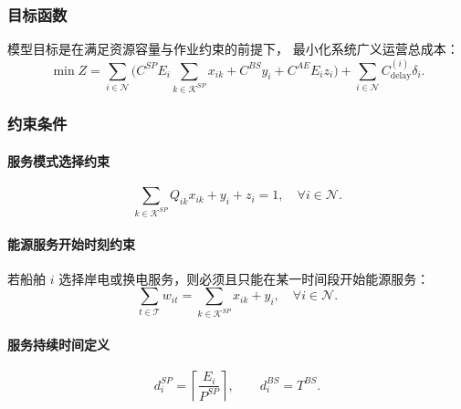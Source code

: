 \documentclass[UTF8, a4paper, 12pt]{ctexart}
\theoremstyle{plain}
\theoremstyle{definition}
\theoremstyle{remark}
\begin{document}
\subsubsection{目标函数}

模型目标是在满足资源容量与作业约束的前提下，
最小化系统广义运营总成本：
\begin{equation}
\min Z =
\sum_{i \in \mathcal{N}}
\Big(
C^{SP} E_i \sum_{k \in \mathcal{K}^{SP}} x_{ik}
+ C^{BS} y_i
+ C^{AE} E_i z_i
\Big)
+ \sum_{i \in \mathcal{N}} C^{(i)}_{\text{delay}} \delta_i .
\label{eq:obj_24_final}
\end{equation}

\subsubsection{约束条件}

\paragraph{服务模式选择约束}
\begin{equation}
\sum_{k \in \mathcal{K}^{SP}} Q_{ik} x_{ik} + y_i + z_i = 1,
\quad \forall i \in \mathcal{N}.
\label{eq:mode_24_final}
\end{equation}

\paragraph{能源服务开始时刻约束}
若船舶 $i$ 选择岸电或换电服务，则必须且只能在某一时间段开始能源服务：
\begin{equation}
\sum_{t \in \mathcal{T}} w_{it}
=
\sum_{k \in \mathcal{K}^{SP}} x_{ik} + y_i,
\quad \forall i \in \mathcal{N}.
\label{eq:w_unique_24}
\end{equation}

\paragraph{服务持续时间定义}
\begin{equation}
d_i^{SP} = \left\lceil \frac{E_i}{P^{SP}} \right\rceil, 
\qquad
d_i^{BS} = T^{BS}.
\label{eq:duration_24}
\end{equation}
\end{document}
